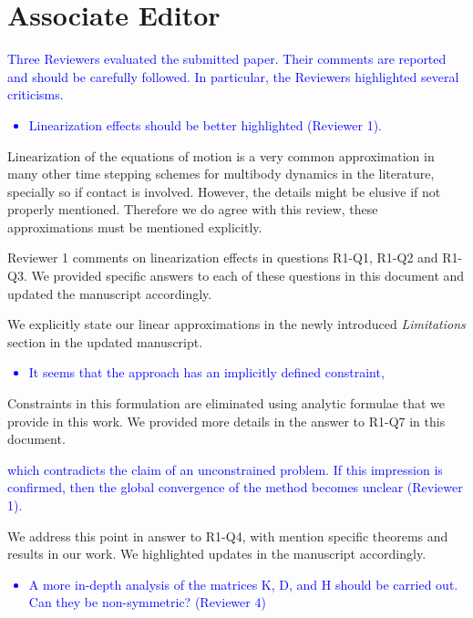 \section{Associate Editor}
\label{sec:associate_editor}

\textcolor{blue}{Three Reviewers evaluated the submitted paper. Their comments
are reported and should be carefully followed. In particular, the Reviewers
highlighted several criticisms.}
\textcolor{blue}{\begin{itemize}
    \item Linearization effects should be better highlighted (Reviewer 1).
\end{itemize}}
Linearization of the equations of motion is a very common approximation in many
other time stepping schemes for multibody dynamics in the literature, specially
so if contact is involved. However, the details might be elusive if not properly
mentioned. Therefore we do agree with this review, these approximations must be
mentioned explicitly.

Reviewer 1 comments on linearization effects in questions R1-Q1, R1-Q2 and
R1-Q3. We provided specific answers to each of these questions in this document
and updated the manuscript accordingly. 

We explicitly state our linear approximations in the newly introduced
\emph{Limitations} section in the updated manuscript.

\textcolor{blue}{\begin{itemize}
    \item It seems that the approach has an implicitly defined constraint,
\end{itemize}}
Constraints in this formulation are eliminated using analytic formulae that we
provide in this work. We provided more details in the answer to R1-Q7 in this
document.

\textcolor{blue}{which contradicts the claim of an unconstrained problem. If
this impression is confirmed, then the global convergence of the method becomes
unclear (Reviewer 1).}

We address this point in answer to R1-Q4, with mention specific theorems and
results in our work. We highlighted updates in the manuscript accordingly.

\textcolor{blue}{
\begin{itemize}
    \item A more in-depth analysis of the matrices K, D, and H should be
    carried out. Can they be non-symmetric? (Reviewer 4)
\end{itemize}}

